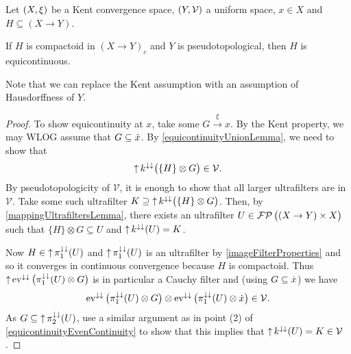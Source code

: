 \begin{proposition}
Let $\sSet{X,\xi}$ be a Kent convergence space, $\sSet{Y, \mathcal{V}}$ a uniform space, $x\in X$ and $H \subseteq (X\to Y)$.

If $H$ is compactoid in $(X\to Y)_c$ and $Y$ is pseudotopological, then $H$ is equicontinuous.
\end{proposition}
Note that we can replace the Kent assumption with an assumption of Hausdorffness of $Y$.
\begin{proof}
To show equicontinuity at $x$, take some $G\overset{\xi}{\longrightarrow} x$. By the Kent property, we may WLOG assume that $G\subseteq \dot{x}$. By \ref{equicontinuityUnionLemma}, we need to show that
\[ \operatorname{\uparrow} k^{\downarrow\downarrow}\big(\{H\}\otimes G\big) \in \mathcal{V}. \]
By pseudotopologicity of $\mathcal{V}$, it is enough to show that all larger ultrafilters are in $\mathcal{V}$. Take some such ultrafilter $K \supseteq \operatorname{\uparrow} k^{\downarrow\downarrow}\big(\{H\}\otimes G\big)$. Then, by \ref{mappingUltrafiltersLemma}, there exists an ultrafilter $U\in \operatorname{\mathcal{FP}}\big((X\to Y)\times X\big)$ such that $\{H\}\otimes G \subseteq U$ and $\operatorname{\uparrow} k^{\downarrow\downarrow}(U) = K$.

Now $H\in \operatorname{\uparrow}\pi_1^{\downarrow\downarrow}(U)$ and $\operatorname{\uparrow}\pi_1^{\downarrow\downarrow}(U)$ is an ultrafilter by \ref{imageFilterProperties} and so it converges in continuous convergence because $H$ is compactoid. Thus $\operatorname{\uparrow}\operatorname{ev}^{\downarrow\downarrow}\big(\pi_1^{\downarrow\downarrow}(U)\otimes G\big)$ is in particular a Cauchy filter and (using $G\subseteq \dot{x}$) we have
\[ \operatorname{ev}^{\downarrow\downarrow}\big(\pi_1^{\downarrow\downarrow}(U)\otimes G\big) \otimes \operatorname{ev}^{\downarrow\downarrow}\big(\pi_1^{\downarrow\downarrow}(U)\otimes \dot{x}\big) \in \mathcal{V}. \]
As $G \subseteq \operatorname{\uparrow}\pi_2^{\downarrow\downarrow}(U)$, use a similar argument as in point (2) of \ref{equicontinuityEvenContinuity} to show that this implies that $\operatorname{\uparrow} k^{\downarrow\downarrow}(U) = K \in \mathcal{V}$.
\end{proof}

